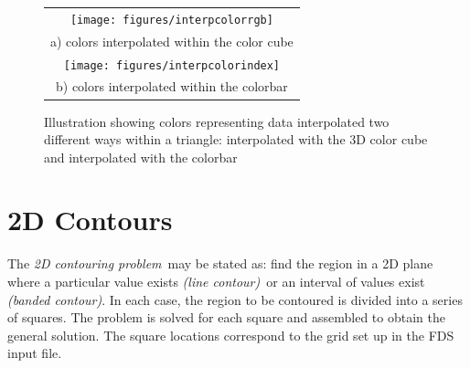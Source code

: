 \documentclass[11pt,twoside]{book}
\newcommand{\figoptions}{htp}
\begin{document}
\begin{figure}[\figoptions]
\begin{center}
\begin{tabular}{c}
\texttt{[image: figures/interpcolorrgb]}\\
a) colors interpolated within the color cube\\
\texttt{[image: figures/interpcolorindex]}\\
b) colors interpolated within the colorbar\\
\end{tabular}
\end{center}
\caption[Color interpolation examples]
{Illustration showing colors representing data interpolated two different ways within a triangle: interpolated with the 3D color cube and interpolated with the colorbar}
\label{colorinterp}%
\end{figure}


\section{2D Contours}

The {\em 2D contouring problem}\ may be stated as: find the region in a 2D plane where a particular value exists {\em (line contour)}\ or an interval of values exist {\em (banded contour)}.   In each case, the  region to be contoured is divided into a series of squares.  The problem is solved for each square and assembled to obtain the general solution.  The square locations correspond to the grid set up in the FDS input file.
\end{document}

